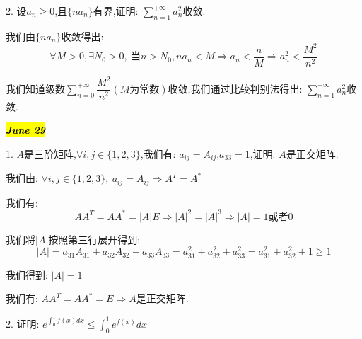 2. 设$a_{n}\geq 0$,且$\{na_{n}\}$有界,证明: $\sum\limits_{n=1}^{+\infty}a_{n}^2$收敛.
\begin{solution}
	
	我们由$\{na_{n}\}$收敛得出: 
	$$\forall M>0, \exists N_{0}>0,\ \text{当}n>N_{0}, na_{n}<M\Rightarrow a_{n}<\dfrac{n}{M}\Rightarrow a_{n}^2<\dfrac{M^2}{n^2} $$
	
	我们知道级数$\sum\limits_{n=0}^{+\infty}\dfrac{M^2}{n^2}(M\text{为常数})$收敛,我们通过比较判别法得出: $\sum\limits_{n=1}^{+\infty}a_{n}^2$收敛.
\end{solution}

\hl{\textbf{\textit{June 29}}}

1. $A$是三阶矩阵,$\forall i,j\in\{1,2,3\}$,我们有: $a_{ij}=A_{ij}$,$a_{33}=1$,证明: $A$是正交矩阵.
\begin{solution}
	
	我们由: $\forall i,j\in\{1,2,3\},\ a_{ij}=A_{ij}\Rightarrow A^{T}=A^{*}$
	
	我们有: $$AA^{T}=AA^{*}=|A|E\Rightarrow |A|^2=|A|^3\Rightarrow |A|=1\text{或者}0$$
	
	我们将$|A|$按照第三行展开得到: $$|A|=a_{31}A_{31}+a_{32}A_{32}+a_{33}A_{33}=a_{31}^2+a_{32}^2+a_{33}^2=a_{31}^2+a_{32}^2+1\geq 1$$
	
	我们得到: $|A|=1$
	
	我们有: $AA^{T}=AA^{*}=E\Rightarrow A\text{是正交矩阵}$.
\end{solution}

2. 证明: $e^{\int_{0}^{1}f(x)dx}\leq \int_{0}^{1}e^{f(x)}dx$

